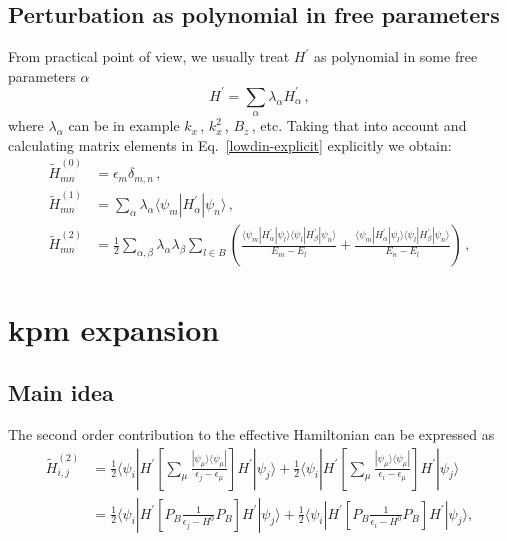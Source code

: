 \documentclass[10pt, onecolumn, aps, prb, superscriptaddress, floatfix, showpacs, notitlepage]{revtex4-1}
\newcommand{\bra}[1]{\langle #1|}
\newcommand{\ket}[1]{|#1\rangle}
\begin{document}
\subsection{Perturbation as polynomial in free parameters}
From practical point of view, we usually treat $H^{\prime}$ as polynomial in some free parameters $\alpha$
\begin{equation}
H^{\prime} = \sum_\alpha \lambda_\alpha H^{\prime}_\alpha\,,
\end{equation}
where $\lambda_\alpha$ can be in example $k_x\,$, $k_x^2\,$, $B_z\,$, etc.
Taking that into account and calculating matrix elements in Eq.~\eqref{lowdin-explicit} explicitly we obtain:
\begin{subequations}
\label{lowdin-explicit}
\begin{align}
    \tilde{H}^{(0)}_{mn} &= \epsilon_m \delta_{m,n} \,,\\
    \tilde{H}^{(1)}_{mn} &= \sum_{\alpha} \lambda_\alpha \bra{\psi_m} H^{\prime}_\alpha \ket{\psi_n} \,,\\
    \tilde{H}^{(2)}_{mn} &= \frac{1}{2} \sum_{\alpha,\beta} \lambda_\alpha\lambda_\beta\sum_{l\in B}
    \left(\frac{\bra{\psi_m}H^{\prime}_{\alpha}\ket{\psi_l}\bra{\psi_l}H^{\prime}_{\beta}\ket{\psi_n}}{E_m - E_l} + \frac{\bra{\psi_m}H^{\prime}_{\alpha}\ket{\psi_l}\bra{\psi_l}H^{\prime}_{\beta}\ket{\psi_n}}{E_n - E_l}\right)\,,
\end{align}
\end{subequations}



\section{kpm expansion}

\subsection{Main idea}

The second order contribution to the effective Hamiltonian can be expressed as
\begin{align}
\tilde{H}^{(2)}_{i,j} &= \frac{1}{2}
\bra{\psi_i} H^{\prime}
\left[
\sum_\mu
\frac{\ket{\psi_\mu} \bra{\psi_\mu}}{\epsilon_j-\epsilon_\mu}
\right]
H^{\prime} \ket{\psi_j}
+
\frac{1}{2}
\bra{\psi_i} H^{\prime}
\left[
\sum_\mu
\frac{\ket{\psi_\mu} \bra{\psi_\mu}}{\epsilon_i-\epsilon_\mu}
\right]
H^{\prime} \ket{\psi_j}
\\
&= \frac{1}{2}
\bra{\psi_i} H^{\prime}
\left[P_B
\frac{1}{\epsilon_j-H^0}
P_B\right]
H^{\prime} \ket{\psi_j}
+
\frac{1}{2}
\bra{\psi_i} H^{\prime}
\left[P_B
\frac{1}{\epsilon_i-H^0}
P_B\right]
H^{\prime} \ket{\psi_j},
\end{align}
\end{document}
